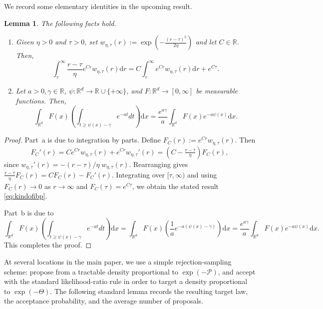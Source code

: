 \documentclass[11pt,letterpaper]{article}
\newcommand{\R}{\mathbb{R}}
\newcommand{\D}{\mathrm{d}}
\newtheorem{lemma}[thm]{Lemma}
\begin{document}

We record some elementary identities in the upcoming result. 
\begin{lemma} \label{lem:basicfacts}     
The following facts hold. 
\begin{enumerate}[label=\alph*)]
    \item Given $\eta>0$ and $\tau>0$, set $w_{\eta,\tau}(r):=\exp \left(-\frac{(r-\tau)^2}{2\eta}\right)$ and
let $C\in\R$. Then,
\begin{equation}\label{eq:kindofibp}
\int_{\tau}^{\infty} \frac{r-\tau}{\eta}e^{Cr}w_{\eta,\tau}(r) \D r
= C\int_{\tau}^{\infty} e^{Cr}w_{\eta,\tau}(r) \D r + e^{C\tau}.
\end{equation}
\item Let $a>0, \gamma\in\R$, $\psi:\R^d\to\R\cup\{+\infty\}$, and $F:\R^d\to[0,\infty]$ be measurable functions. Then,
\begin{equation}
    \label{eq:intoverQ}
   \int_{\R^d} F(x)\left(\int_{t\ge \psi(x)-\gamma} e^{-a t} dt\right)\D x
=\frac{e^{a\gamma}}{a}\int_{\R^d} F(x) e^{-a\psi(x)} \D x.  
\end{equation}
\end{enumerate}

\end{lemma}

\begin{proof}
Part~a is due to integration by parts. Define $F_C(r):=e^{Cr}w_{\eta,\tau}(r)$. Then
\[
F_C'(r)=Ce^{Cr}w_{\eta,\tau}(r)+e^{Cr}w_{\eta,\tau}'(r)
=\left(C-\tfrac{r-\tau}{\eta}\right)F_C(r),
\]
since $w_{\eta,\tau}'(r)=-(r-\tau)/\eta\;w_{\eta,\tau}(r)$.
Rearranging gives $\frac{r-\tau}{\eta}F_C(r)=C F_C(r)-F_C'(r)$.
Integrating over $[\tau,\infty)$ and using $F_C(r)\to 0$ as $r\to\infty$ and
$F_C(\tau)=e^{C\tau}$, we obtain the stated result \eqref{eq:kindofibp}.

Part~b is due to 
\[
    \int_{\R^d} F(x)\left(\int_{t\ge \psi(x)-\gamma} e^{-a t} dt\right)\D x
=\int_{\R^d} F(x) \left( \frac{1}{a}e^{-a(\psi(x)-\gamma)} \right) \D x \nonumber=\frac{e^{a\gamma}}{a}\int_{\R^d} F(x) e^{-a\psi(x)} \D x. 
\]
This completes the proof.
\end{proof}


At several locations in the main paper, we use a simple rejection-sampling scheme: propose from a tractable density proportional to $\exp(-\mathcal{P})$, and accept with the standard likelihood-ratio rule in order to target a density proportional to $\exp(-\Theta)$.
The following standard lemma records the resulting target law, the acceptance probability, and the average number of proposals.
\end{document}
